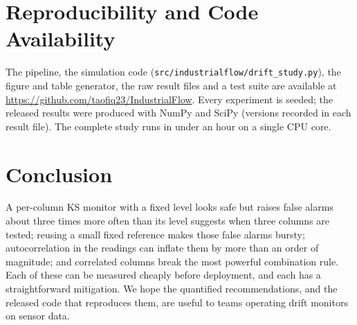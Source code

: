 \documentclass[11pt]{article}
\begin{document}
\section{Reproducibility and Code Availability}

The pipeline, the simulation code (\texttt{src/industrialflow/drift\_study.py}), the figure and table generator, the raw result files and a test suite are available at \url{https://github.com/taofiq23/IndustrialFlow}. Every experiment is seeded; the released results were produced with NumPy and SciPy (versions recorded in each result file). The complete study runs in under an hour on a single CPU core.

\section{Conclusion}

A per-column KS monitor with a fixed level looks safe but raises false alarms about three times more often than its level suggests when three columns are tested; reusing a small fixed reference makes those false alarms bursty; autocorrelation in the readings can inflate them by more than an order of magnitude; and correlated columns break the most powerful combination rule. Each of these can be measured cheaply before deployment, and each has a straightforward mitigation. We hope the quantified recommendations, and the released code that reproduces them, are useful to teams operating drift monitors on sensor data.
\end{document}
